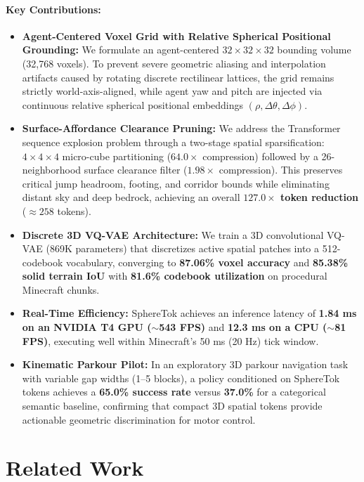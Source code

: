 \documentclass[10pt,twocolumn,letterpaper]{article}
\begin{document}
\paragraph{Key Contributions:}
\begin{itemize}[leftmargin=*]
    \item \textbf{Agent-Centered Voxel Grid with Relative Spherical Positional Grounding:} We formulate an agent-centered $32 \times 32 \times 32$ bounding volume (32,768 voxels). To prevent severe geometric aliasing and interpolation artifacts caused by rotating discrete rectilinear lattices, the grid remains strictly world-axis-aligned, while agent yaw and pitch are injected via continuous relative spherical positional embeddings $(\rho, \Delta\theta, \Delta\phi)$.
    \item \textbf{Surface-Affordance Clearance Pruning:} We address the Transformer sequence explosion problem through a two-stage spatial sparsification: $4 \times 4 \times 4$ micro-cube partitioning ($64.0\times$ compression) followed by a 26-neighborhood surface clearance filter ($1.98\times$ compression). This preserves critical jump headroom, footing, and corridor bounds while eliminating distant sky and deep bedrock, achieving an overall \textbf{$127.0\times$ token reduction} ($\approx 258$ tokens).
    \item \textbf{Discrete 3D VQ-VAE Architecture:} We train a 3D convolutional VQ-VAE (869K parameters) that discretizes active spatial patches into a 512-codebook vocabulary, converging to \textbf{87.06\% voxel accuracy} and \textbf{85.38\% solid terrain IoU} with \textbf{81.6\% codebook utilization} on procedural Minecraft chunks.
    \item \textbf{Real-Time Efficiency:} SphereTok achieves an inference latency of \textbf{1.84 ms on an NVIDIA T4 GPU ($\sim$543 FPS)} and \textbf{12.3 ms on a CPU ($\sim$81 FPS)}, executing well within Minecraft's 50 ms (20 Hz) tick window.
    \item \textbf{Kinematic Parkour Pilot:} In an exploratory 3D parkour navigation task with variable gap widths (1--5 blocks), a policy conditioned on SphereTok tokens achieves a \textbf{65.0\% success rate} versus \textbf{37.0\%} for a categorical semantic baseline, confirming that compact 3D spatial tokens provide actionable geometric discrimination for motor control.
\end{itemize}

\section{Related Work}
\end{document}
